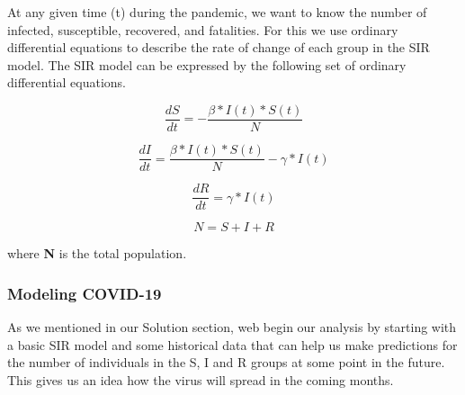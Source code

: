 \documentclass[11pt]{article}
\begin{document}
At any given time (t) during the pandemic, we want to know the number of infected, susceptible, recovered, and fatalities. For this we use ordinary differential equations to describe the rate of change of each group in the SIR model. The SIR model can be expressed by the following set of ordinary differential equations.

\begin{equation}
    \label{eq2}
    \frac{dS}{dt} = - \frac{\beta * I(t) * S(t)}{N}
\end{equation}

\begin{equation}
    \label{eq3}
    \frac{dI}{dt} = \frac{\beta * I(t) * S(t)}{N} - \gamma * I(t) 
\end{equation}

\begin{equation}
    \label{eq4}
    \frac{dR}{dt} = \gamma * I(t) 
\end{equation}

\begin{equation}
    \label{eq5}
    N = S + I + R
\end{equation}

where \textbf{N} is the total population.

\subsubsection{Modeling COVID-19}
As we mentioned in our Solution section, web begin our analysis by starting with a basic SIR model and some historical data that can help us make predictions for the number of individuals in the S, I and R groups at some point in the future. This gives us an idea how the virus will spread in the coming months. 
\end{document}
